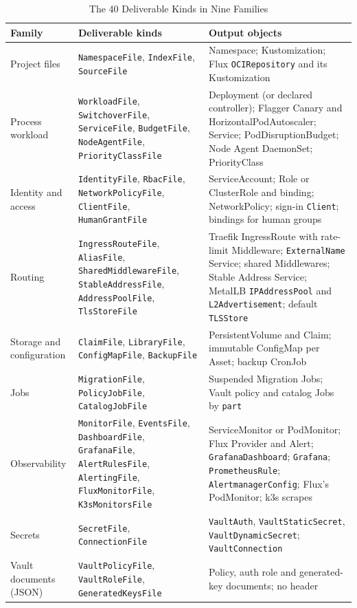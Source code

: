 \begin{table}[!htbp]
\centering
\small
\begin{tabular}{p{3.0cm}p{6.0cm}p{6.4cm}}
\hline
Family & Deliverable kinds & Output objects \\
\hline
Project files & \texttt{NamespaceFile}, \texttt{IndexFile}, \texttt{SourceFile} & Namespace; Kustomization; Flux \texttt{OCIRepository} and its Kustomization \\
Process workload & \texttt{WorkloadFile}, \texttt{SwitchoverFile}, \texttt{ServiceFile}, \texttt{BudgetFile}, \texttt{NodeAgentFile}, \texttt{PriorityClassFile} & Deployment (or declared controller); Flagger Canary and HorizontalPodAutoscaler; Service; PodDisruptionBudget; Node Agent DaemonSet; PriorityClass \\
Identity and access & \texttt{IdentityFile}, \texttt{RbacFile}, \texttt{NetworkPolicyFile}, \texttt{ClientFile}, \texttt{HumanGrantFile} & ServiceAccount; Role or ClusterRole and binding; NetworkPolicy; sign-in \texttt{Client}; bindings for human groups \\
Routing & \texttt{IngressRouteFile}, \texttt{AliasFile}, \texttt{SharedMiddlewareFile}, \texttt{StableAddressFile}, \texttt{AddressPoolFile}, \texttt{TlsStoreFile} & Traefik IngressRoute with rate-limit Middleware; \texttt{ExternalName} Service; shared Middlewares; Stable Address Service; MetalLB \texttt{IPAddressPool} and \texttt{L2Advertisement}; default \texttt{TLSStore} \\
Storage and configuration & \texttt{ClaimFile}, \texttt{LibraryFile}, \texttt{ConfigMapFile}, \texttt{BackupFile} & PersistentVolume and Claim; immutable ConfigMap per Asset; backup CronJob \\
Jobs & \texttt{MigrationFile}, \texttt{PolicyJobFile}, \texttt{CatalogJobFile} & Suspended Migration Jobs; Vault policy and catalog Jobs by \texttt{part} \\
Observability & \texttt{MonitorFile}, \texttt{EventsFile}, \texttt{DashboardFile}, \texttt{GrafanaFile}, \texttt{AlertRulesFile}, \texttt{AlertingFile}, \texttt{FluxMonitorFile}, \texttt{K3sMonitorsFile} & ServiceMonitor or PodMonitor; Flux Provider and Alert; \texttt{GrafanaDashboard}; \texttt{Grafana}; \texttt{PrometheusRule}; \texttt{AlertmanagerConfig}; Flux's PodMonitor; k3s scrapes \\
Secrets & \texttt{SecretFile}, \texttt{ConnectionFile} & \texttt{VaultAuth}, \texttt{VaultStaticSecret}, \texttt{VaultDynamicSecret}; \texttt{VaultConnection} \\
Vault documents (JSON) & \texttt{VaultPolicyFile}, \texttt{VaultRoleFile}, \texttt{GeneratedKeysFile} & Policy, auth role and generated-key documents; no header \\
\hline
\end{tabular}
\caption{The 40 Deliverable Kinds in Nine Families}
\label{tab:kinds}
\end{table}

